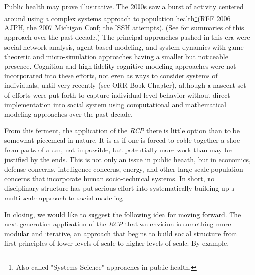 \documentclass{article}
\begin{document}
Public health may prove illustrative.  The 2000s saw a burst of activity centered around using a complex systems approach to population health\footnote{Also called "Systems Science" approaches in public health.}(REF 2006 AJPH, the 2007 Michigan Conf; the ISSH attempts). (See \cite{Galea, 2017; Kaplan, 2017} for summaries of this approach over the past decade.)  The principal approaches pushed in this era were social network analysis, agent-based modeling, and system dynamics with game theoretic and micro-simulation approaches having a smaller but noticeable presence.  Cognition and high-fidelity cognitive modeling approaches were not incorporated into these efforts, not even as ways to consider systems of individuals, until very recently (see ORR Book Chapter), although a nascent set of efforts were put forth to capture individual level behavior without direct implementation into social system \cite{Orr 2017} using computational and mathematical modeling approaches over the past decade.

From this ferment, the application of the \textit{RCP} there is little option than to be somewhat piecemeal in nature.  It is as if one is forced to coble together a shoe from parts of a car, not impossible, but potentially more work than may be justified by the ends. This is not only an issue in public heaath, but in economics, defense concerns, intelligence concerns, energy, and other large-scale population concerns that incorporate human socio-technical systems.  In short, no disciplinary structure has put serious effort into systematically building up a multi-scale approach to social modeling.

In closing, we would like to suggest the following idea for moving forward.  The next generation application of the \textit{RCP} that we envision is something more modular and iterative, an approach that begins to build social structure from first principles of lower levels of scale to higher levels of scale.  By example, 








\end{document}
